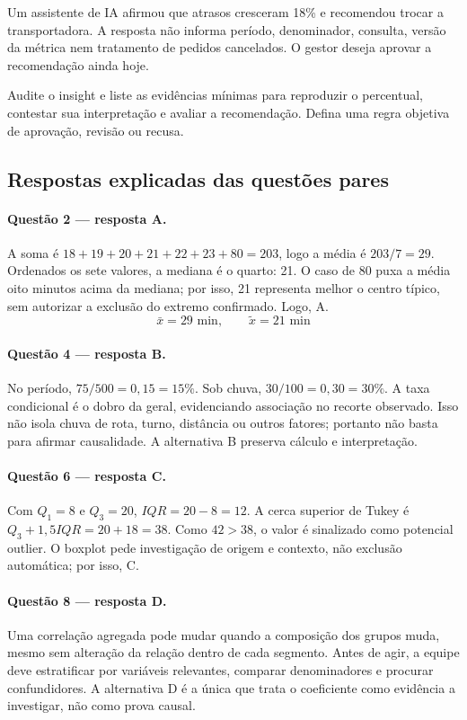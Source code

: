 Um assistente de IA afirmou que atrasos cresceram 18\% e recomendou trocar a transportadora. A resposta não informa período, denominador, consulta, versão da métrica nem tratamento de pedidos cancelados. O gestor deseja aprovar a recomendação ainda hoje.

\FonteDidatica

\Comando Audite o insight e liste as evidências mínimas para reproduzir o percentual, contestar sua interpretação e avaliar a recomendação. Defina uma regra objetiva de aprovação, revisão ou recusa.

\newpage

\subsection{Respostas explicadas das questões pares}

\paragraph{Questão 2 --- resposta A.} A soma é $18+19+20+21+22+23+80=203$, logo a média é $203/7=29$. Ordenados os sete valores, a mediana é o quarto: 21. O caso de 80 puxa a média oito minutos acima da mediana; por isso, 21 representa melhor o centro típico, sem autorizar a exclusão do extremo confirmado. Logo, A.
\[\bar x=29\text{ min},\qquad \widetilde{x}=21\text{ min}\]

\paragraph{Questão 4 --- resposta B.} No período, $75/500=0{,}15=15\%$. Sob chuva, $30/100=0{,}30=30\%$. A taxa condicional é o dobro da geral, evidenciando associação no recorte observado. Isso não isola chuva de rota, turno, distância ou outros fatores; portanto não basta para afirmar causalidade. A alternativa B preserva cálculo e interpretação.

\paragraph{Questão 6 --- resposta C.} Com $Q_1=8$ e $Q_3=20$, $IQR=20-8=12$. A cerca superior de Tukey é $Q_3+1{,}5IQR=20+18=38$. Como $42>38$, o valor é sinalizado como potencial outlier. O boxplot pede investigação de origem e contexto, não exclusão automática; por isso, C.

\paragraph{Questão 8 --- resposta D.} Uma correlação agregada pode mudar quando a composição dos grupos muda, mesmo sem alteração da relação dentro de cada segmento. Antes de agir, a equipe deve estratificar por variáveis relevantes, comparar denominadores e procurar confundidores. A alternativa D é a única que trata o coeficiente como evidência a investigar, não como prova causal.

